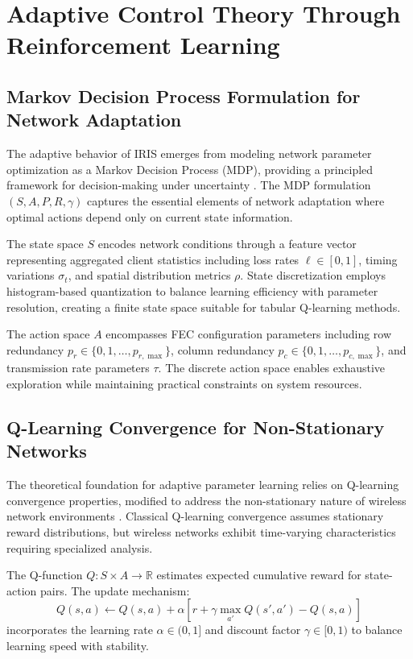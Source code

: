 \section{Adaptive Control Theory Through Reinforcement Learning}

\subsection{Markov Decision Process Formulation for Network Adaptation}

The adaptive behavior of IRIS emerges from modeling network parameter optimization as a Markov Decision Process (MDP), providing a principled framework for decision-making under uncertainty \cite{sutton2018reinforcement}. The MDP formulation $(S, A, P, R, \gamma)$ captures the essential elements of network adaptation where optimal actions depend only on current state information.

The state space $S$ encodes network conditions through a feature vector representing aggregated client statistics including loss rates $\ell \in [0,1]$, timing variations $\sigma_t$, and spatial distribution metrics $\rho$. State discretization employs histogram-based quantization to balance learning efficiency with parameter resolution, creating a finite state space suitable for tabular Q-learning methods.

The action space $A$ encompasses FEC configuration parameters including row redundancy $p_r \in \{0, 1, \ldots, p_{r,\max}\}$, column redundancy $p_c \in \{0, 1, \ldots, p_{c,\max}\}$, and transmission rate parameters $\tau$. The discrete action space enables exhaustive exploration while maintaining practical constraints on system resources.

\subsection{Q-Learning Convergence for Non-Stationary Networks}

The theoretical foundation for adaptive parameter learning relies on Q-learning convergence properties, modified to address the non-stationary nature of wireless network environments \cite{watkins1992q}. Classical Q-learning convergence assumes stationary reward distributions, but wireless networks exhibit time-varying characteristics requiring specialized analysis.

The Q-function $Q: S \times A \rightarrow \mathbb{R}$ estimates expected cumulative reward for state-action pairs. The update mechanism:
$$Q(s,a) \leftarrow Q(s,a) + \alpha[r + \gamma \max_{a'} Q(s',a') - Q(s,a)]$$
incorporates the learning rate $\alpha \in (0,1]$ and discount factor $\gamma \in [0,1)$ to balance learning speed with stability.

